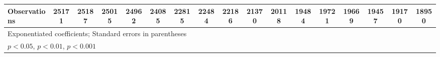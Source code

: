 {\begin{tabular}{l*{16}{c}}
\hline
Observations        &       25171         &       25187         &       25015         &       24962         &       24085         &       22815         &       22484         &       22186         &       21370         &       20118         &       19484         &       19721         &       19669         &       19457         &       19170         &       18950         \\
\hline\hline
\multicolumn{17}{l}{\footnotesize Exponentiated coefficients; Standard errors in parentheses}\\
\multicolumn{17}{l}{\footnotesize \sym{*} \(p<0.05\), \sym{**} \(p<0.01\), \sym{***} \(p<0.001\)}\\
\end{tabular}
}
